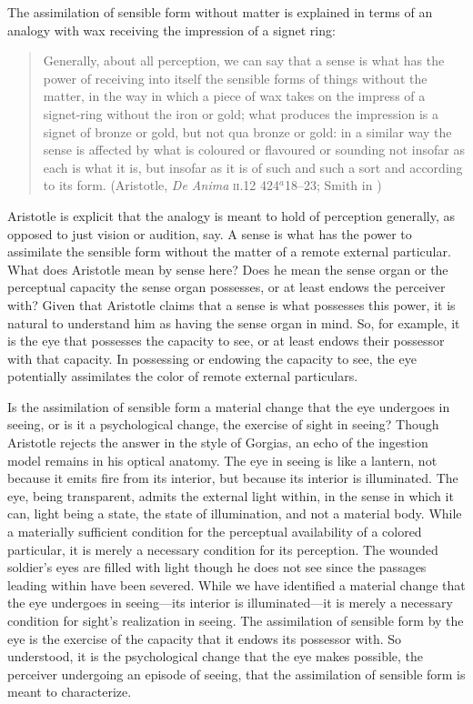 The assimilation of sensible form without matter is explained in terms of an analogy with wax receiving the impression of a signet ring:
\begin{quote}
	Generally, about all perception, we can say that a sense is what has the power of receiving into itself the sensible forms of things without the matter, in the way in which a piece of wax takes on the impress of a signet-ring without the iron or gold; what produces the impression is a signet of bronze or gold, but not qua bronze or gold: in a similar way the sense is affected by what is coloured or flavoured or sounding not insofar as each is what it is, but insofar as it is of such and such a sort and according to its form. (Aristotle, \emph{De Anima} \textsc{ii}.12 424\( ^{a} \)18--23; Smith in \citealt[42--43]{Barnes:1984uq})
\end{quote}
Aristotle is explicit that the analogy is meant to hold of perception generally, as opposed to just vision or audition, say. A sense is what has the power to assimilate the sensible form without the matter of a remote external particular. What does Aristotle mean by sense here? Does he mean the sense organ or the perceptual capacity the sense organ possesses, or at least endows the perceiver with? Given that Aristotle claims that a sense is what possesses this power, it is natural to understand him as having the sense organ in mind. So, for example, it is the eye that possesses the capacity to see, or at least endows their possessor with that capacity. In possessing or endowing the capacity to see, the eye potentially assimilates the color of remote external particulars. 

Is the assimilation of sensible form a material change that the eye undergoes in seeing, or is it a psychological change, the exercise of sight in seeing? Though Aristotle rejects the answer in the style of Gorgias, an echo of the ingestion model remains in his optical anatomy. The eye in seeing is like a lantern, not because it emits fire from its interior, but because its interior is illuminated. The eye, being transparent, admits the external light within, in the sense in which it can, light being a state, the state of illumination, and not a material body. While a materially sufficient condition for the perceptual availability of a colored particular, it is merely a necessary condition for its perception. The wounded soldier's eyes are filled with light though he does not see since the passages leading within have been severed. While we have identified a material change that the eye undergoes in seeing---its interior is illuminated---it is merely a necessary condition for sight's realization in seeing. The assimilation of sensible form by the eye is the exercise of the capacity that it endows its possessor with. So understood, it is the psychological change that the eye makes possible, the perceiver undergoing an episode of seeing, that the assimilation of sensible form is meant to characterize.

